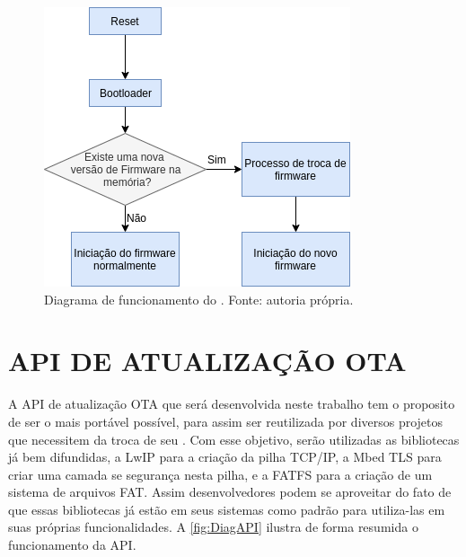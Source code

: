 \begin{figure}[H]
    \scriptsize
     \centering
     \includegraphics[scale=0.9]{dados/figuras/BootloaderDiag.png}
     \caption{Diagrama de funcionamento do \bootloader. \newline Fonte: autoria própria.}
     \label{fig:DiagBootloader}
\end{figure}



\section{API DE ATUALIZAÇÃO OTA}
\label{sec:API}

A API de atualização OTA que será desenvolvida neste trabalho tem o proposito de ser o mais portável possível, para assim ser reutilizada por diversos projetos que necessitem da troca de seu \software. Com esse objetivo, serão utilizadas as bibliotecas já bem difundidas, a LwIP para a criação da pilha TCP/IP, a Mbed TLS para criar uma camada se segurança nesta pilha, e a FATFS para a criação de um sistema de arquivos FAT. Assim desenvolvedores podem se aproveitar do fato de que essas bibliotecas já estão em seus sistemas como padrão para utiliza-las em suas próprias funcionalidades. A \autoref{fig:DiagAPI} ilustra de forma resumida o funcionamento da API.


